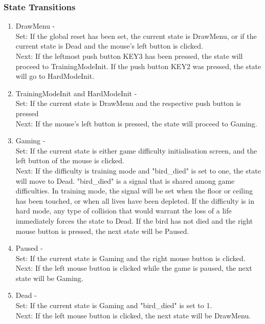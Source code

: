 \documentclass[conference]{IEEEtran}
\begin{document}
\subsubsection{State Transitions}
\begin{enumerate}
    \item DrawMenu - \\
          Set: If the global reset has been set, the current state is DrawMenu, or if the current state is Dead and the mouse's left button is clicked. \\
          Next: If the leftmost push button KEY3 has been pressed, the state will proceed to TrainingModeInit. If the push button KEY2 was pressed, the state will go to HardModeInit.
    \item TrainingModeInit and HardModeInit - \\
          Set: If the current state is DrawMenu and the respective push button is pressed \\
          Next: If the mouse's left button is pressed, the state will proceed to Gaming.
    \item Gaming - \\
          Set: If the current state is either game difficulty initialisation screen, and the left button of the mouse is clicked. \\
          Next: If the difficulty is training mode and "bird\_died" is set to one, the state will move to Dead. "bird\_died" is a signal that is shared among game difficulties. In training mode, the signal will be set when the floor or ceiling has been touched, or when all lives have been depleted. If the difficulty is in hard mode, any type of collision that would warrant the loss of a life immediately forces the state to Dead. If the bird has not died and the right mouse button is pressed, the next state will be Paused.
    \item Paused - \\
          Set: If the current state is Gaming and the right mouse button is clicked. \\
          Next: If the left mouse button is clicked while the game is paused, the next state will be Gaming.
    \item Dead - \\
          Set: If the current state is Gaming and "bird\_died" is set to 1. \\
          Next: If the left mouse button is clicked, the next state will be DrawMenu.
\end{enumerate}
\end{document}
